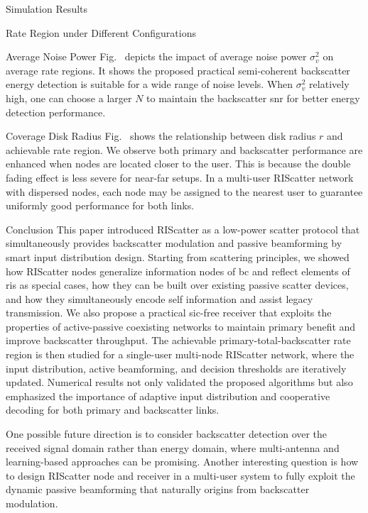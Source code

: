 \documentclass[journal]{IEEEtran}
\begin{document}
\begin{section}{Simulation Results}
\begin{subsection}{Rate Region under Different Configurations}
		\begin{subsubsection}{Average Noise Power}
			Fig.~ depicts the impact of average noise power $\sigma_v^2$ on average rate regions.
			It shows the proposed practical semi-coherent backscatter energy detection is suitable for a wide range of noise levels.
			When $\sigma_v^2$ relatively high, one can choose a larger $N$ to maintain the backscatter \gls{snr} for better energy detection performance.
		\end{subsubsection}

		\begin{subsubsection}{Coverage Disk Radius}
			Fig.~ shows the relationship between disk radius $r$ and achievable rate region.
			We observe both primary and backscatter performance are enhanced when nodes are located closer to the user.
			This is because the double fading effect is less severe for near-far setups.
			In a multi-user RIScatter network with dispersed nodes, each node may be assigned to the nearest user to guarantee uniformly good performance for both links.
		\end{subsubsection}
	\end{subsection}
	\label{st:simulation_results}
\end{section}

\begin{section}{Conclusion}
	This paper introduced RIScatter as a low-power scatter protocol that simultaneously provides backscatter modulation and passive beamforming by smart input distribution design.
	Starting from scattering principles, we showed how RIScatter nodes generalize information nodes of \gls{bc} and reflect elements of \gls{ris} as special cases, how they can be built over existing passive scatter devices, and how they simultaneously encode self information and assist legacy transmission.
	We also propose a practical \gls{sic}-free receiver that exploits the properties of active-passive coexisting networks to maintain primary benefit and improve backscatter throughput.
	The achievable primary-total-backscatter rate region is then studied for a single-user multi-node RIScatter network, where the input distribution, active beamforming, and decision thresholds are iteratively updated.
	Numerical results not only validated the proposed algorithms but also emphasized the importance of adaptive input distribution and cooperative decoding for both primary and backscatter links.

	One possible future direction is to consider backscatter detection over the received signal domain rather than energy domain, where multi-antenna \cite{Liu2022c} and learning-based approaches can be promising.
	Another interesting question is how to design RIScatter node and receiver in a multi-user system to fully exploit the dynamic passive beamforming that naturally origins from backscatter modulation.
\end{section}
\end{document}
